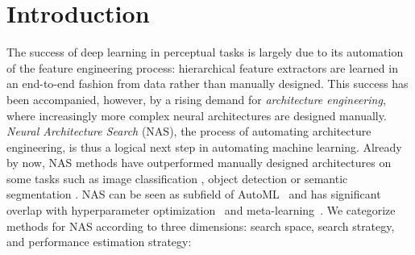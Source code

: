 \documentclass[twoside,11pt]{article}
\renewcommand{\cite}[1]{\citep{#1}}
\begin{document}
\setcounter{footnote}{0}



\section{Introduction} 
The success of deep learning in perceptual tasks is largely due to its automation of the feature engineering process: hierarchical feature extractors are learned in an end-to-end fashion from data rather than manually designed. This success has been accompanied, however, by a rising demand for \emph{architecture engineering}, where increasingly more complex neural architectures are designed manually. \emph{Neural Architecture Search} (NAS), the process of automating architecture engineering, is thus a logical next step in automating machine learning.
Already by now, NAS methods have outperformed manually designed architectures on some tasks such as image classification \citep{DBLP:journals/corr/ZophVSL17,real_regularized_2018}, object detection \citep{DBLP:journals/corr/ZophVSL17} or semantic segmentation \citep{NIPS2018_8087}.
NAS can be seen as subfield of AutoML~\cite{automl_book} and has significant overlap with hyperparameter optimization~\cite{feurer_hyperparameter_2018} and meta-learning~\cite{vanschoren_meta_2018}. We categorize methods for NAS according to three dimensions: search space, search strategy, and performance estimation strategy:
\end{document}
